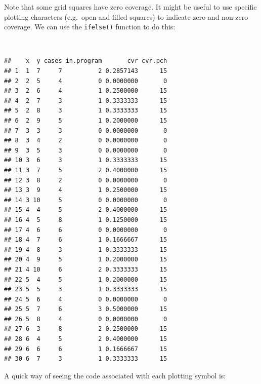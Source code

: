 \documentclass[12pt,a4paper]{book}
\newenvironment{Shaded}{\begin{snugshade}}{\end{snugshade}}
\newcommand{\DecValTok}[1]{\textcolor[rgb]{0.00,0.00,0.81}{#1}}
\newcommand{\KeywordTok}[1]{\textcolor[rgb]{0.13,0.29,0.53}{\textbf{#1}}}
\newcommand{\NormalTok}[1]{#1}
\newcommand{\OperatorTok}[1]{\textcolor[rgb]{0.81,0.36,0.00}{\textbf{#1}}}
\newcommand{\StringTok}[1]{\textcolor[rgb]{0.31,0.60,0.02}{#1}}
\theoremstyle{definition}
\theoremstyle{definition}
\theoremstyle{definition}
\theoremstyle{remark}
\begin{document}
\newpage

Note that some grid squares have zero coverage. It might be useful to
use specific plotting characters (e.g.~open and filled squares) to
indicate zero and non-zero coverage. We can use the \texttt{ifelse()}
function to do this:

~

\begin{Shaded}
\end{Shaded}

\begin{verbatim}
##    x  y cases in.program       cvr cvr.pch
## 1  1  7     7          2 0.2857143      15
## 2  2  5     4          0 0.0000000       0
## 3  2  6     4          1 0.2500000      15
## 4  2  7     3          1 0.3333333      15
## 5  2  8     3          1 0.3333333      15
## 6  2  9     5          1 0.2000000      15
## 7  3  3     3          0 0.0000000       0
## 8  3  4     2          0 0.0000000       0
## 9  3  5     3          0 0.0000000       0
## 10 3  6     3          1 0.3333333      15
## 11 3  7     5          2 0.4000000      15
## 12 3  8     2          0 0.0000000       0
## 13 3  9     4          1 0.2500000      15
## 14 3 10     5          0 0.0000000       0
## 15 4  4     5          2 0.4000000      15
## 16 4  5     8          1 0.1250000      15
## 17 4  6     6          0 0.0000000       0
## 18 4  7     6          1 0.1666667      15
## 19 4  8     3          1 0.3333333      15
## 20 4  9     5          1 0.2000000      15
## 21 4 10     6          2 0.3333333      15
## 22 5  4     5          1 0.2000000      15
## 23 5  5     3          1 0.3333333      15
## 24 5  6     4          0 0.0000000       0
## 25 5  7     6          3 0.5000000      15
## 26 5  8     4          0 0.0000000       0
## 27 6  3     8          2 0.2500000      15
## 28 6  4     5          2 0.4000000      15
## 29 6  6     6          1 0.1666667      15
## 30 6  7     3          1 0.3333333      15
\end{verbatim}

\newpage

A quick way of seeing the code associated with each plotting symbol is:
\end{document}

